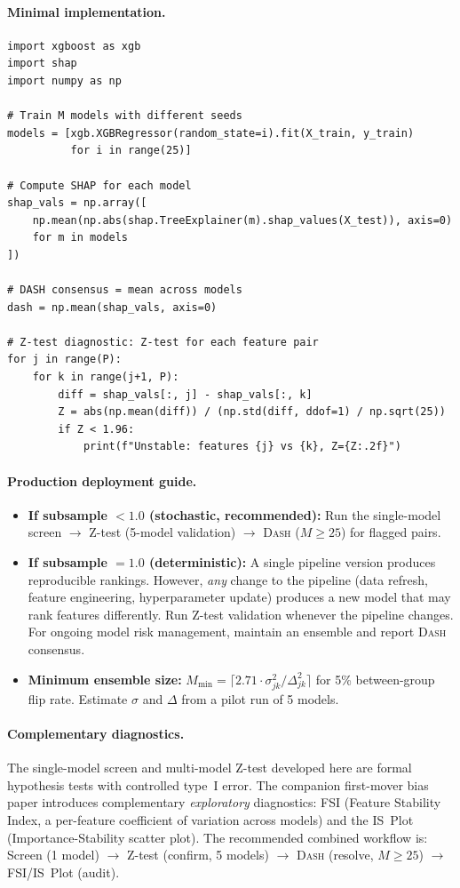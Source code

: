 \documentclass{article}
\newcommand{\DASH}{\textsc{Dash}}
\begin{document}
\paragraph{Minimal implementation.}
\begin{verbatim}
import xgboost as xgb
import shap
import numpy as np

# Train M models with different seeds
models = [xgb.XGBRegressor(random_state=i).fit(X_train, y_train)
          for i in range(25)]

# Compute SHAP for each model
shap_vals = np.array([
    np.mean(np.abs(shap.TreeExplainer(m).shap_values(X_test)), axis=0)
    for m in models
])

# DASH consensus = mean across models
dash = np.mean(shap_vals, axis=0)

# Z-test diagnostic: Z-test for each feature pair
for j in range(P):
    for k in range(j+1, P):
        diff = shap_vals[:, j] - shap_vals[:, k]
        Z = abs(np.mean(diff)) / (np.std(diff, ddof=1) / np.sqrt(25))
        if Z < 1.96:
            print(f"Unstable: features {j} vs {k}, Z={Z:.2f}")
\end{verbatim}

\paragraph{Production deployment guide.}
\begin{itemize}
    \item \textbf{If subsample $< 1.0$ (stochastic, recommended):} Run the single-model screen $\to$ Z-test (5-model validation) $\to$ \DASH{} ($M \geq 25$) for flagged pairs.
    \item \textbf{If subsample $= 1.0$ (deterministic):} A single pipeline version produces reproducible rankings. However, \emph{any} change to the pipeline (data refresh, feature engineering, hyperparameter update) produces a new model that may rank features differently. Run Z-test validation whenever the pipeline changes. For ongoing model risk management, maintain an ensemble and report \DASH{} consensus.
    \item \textbf{Minimum ensemble size:} $M_{\min} = \lceil 2.71 \cdot \sigma_{jk}^2/\Delta_{jk}^2 \rceil$ for 5\% between-group flip rate. Estimate $\sigma$ and $\Delta$ from a pilot run of 5 models.
\end{itemize}

\paragraph{Complementary diagnostics.}
The single-model screen and multi-model Z-test developed here are formal hypothesis tests with controlled type~I error. The companion first-mover bias paper introduces complementary \emph{exploratory} diagnostics: FSI (Feature Stability Index, a per-feature coefficient of variation across models) and the IS~Plot (Importance-Stability scatter plot). The recommended combined workflow is: Screen (1 model) $\to$ Z-test (confirm, 5 models) $\to$ \DASH{} (resolve, $M \geq 25$) $\to$ FSI/IS~Plot (audit).
\end{document}
